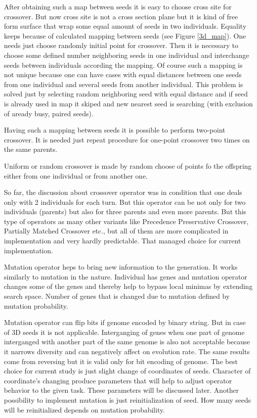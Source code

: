 \documentclass[12pt]{report}
\begin{document}
After obtaining such a map between seeds it is easy to choose cross site for crossover. But now cross site is not a cross section plane but it is kind of free form surface that wrap some equal amount of seeds in two individuals. Equality keeps because of calculated mapping between seeds (see Figure \ref{3d_map}). One needs just choose randomly initial point for crossover. Then it is necessary to choose some defined number neighboring seeds in one individual and interchange seeds between individuals according the mapping. Of course such a mapping is not unique because one can have cases with equal distances between one seeds from one individual and several seeds from another individual. This problem is solved just by selecting random neighboring seed with equal distance and if seed is already used in map it skiped and new nearest seed is searching (with exclusion of aready busy, paired seeds).

Having such a mapping between seeds it is possible to perform two-point crossover. It is needed just repeat procedure for one-point crossover two times on the same parents.

Uniform or random crossover is made by random choose of points fo the offspring either from one individual or from another one.

So far, the discussion about crossover operator was in condition that one deals only with 2 individuals for each turn. But this operator can be not only for two individuals (parents) but also for three parents and even more parents. But this type of operators as many other variants like Precedence Preservative Crossover, Partially Matched Crossover etc., but all of them are more complicated in implementation and very hardly predictable. That managed choice for current implementation.

Mutation operator heps to bring new information to the generation. It works similarly to mutation in the nature. Individual has genes and mutation operator changes some of the genes and thereby help to bypass local minimas by extending search space. Number of genes that is changed due to mutation defined by mutation probability.

Mutation operator can flip bits if genome encoded by binary string. But in case of 3D seeds it is not applicable. Interganging of genes when one part of genome interganged with another part of the same genome is also not acceptable because it narrows diversity and can negatively affect on evolution rate. The same results come from reversing but it is valid only for bit encoding of genome. The best choice for current study is just slight change of coordinates of seeds. Character of coordinate's changing produce parameters that will help to adjust operator behavior to the given task. These parameters will be discussed later. Another possibility to implement mutation is just reinitialization of seed. How many seeds will be reinitialized depends on mutation probability.
\end{document}
